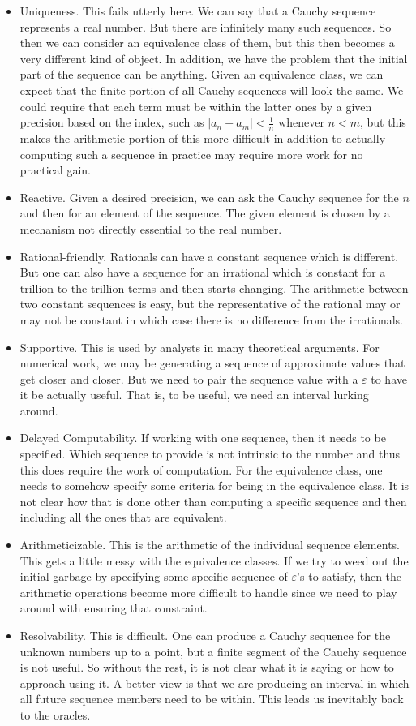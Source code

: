 \documentclass[12pt]{article}
\theoremstyle{remark}
\begin{document}
\begin{itemize}
    \item Uniqueness. This fails utterly here. We can say that a Cauchy sequence represents a real number. But there are infinitely many such sequences. So then we can consider an equivalence class of them, but this then becomes a very different kind of object. In addition, we have the problem that the initial part of the sequence can be anything. Given an equivalence class, we can expect that the finite portion of all Cauchy sequences will look the same. We could require that each term must be within the latter ones by a given precision based on the index, such as $|a_n - a_m| < \tfrac{1}{n}$ whenever $n < m$, but this makes the arithmetic portion of this more difficult in addition to actually computing such a sequence in practice may require more work for no practical gain. 
    \item Reactive. Given a desired precision, we can ask the Cauchy sequence for the $n$ and then for an element of the sequence. The given element is chosen by a mechanism not directly essential to the real number. 
    \item Rational-friendly. Rationals can have a constant sequence which is different. But one can also have a sequence for an irrational which is constant for a trillion to the trillion terms and then starts changing. The arithmetic between two constant sequences is easy, but the representative of the rational may or may not be constant in which case there is no difference from the irrationals.   
    \item Supportive. This is used by analysts in many theoretical arguments. For numerical work, we may be generating a sequence of approximate values that get closer and closer. But we need to pair the sequence value with a $\varepsilon$ to have it be actually useful. That is, to be useful, we need an interval lurking around. 
    \item Delayed Computability. If working with one sequence, then it needs to be specified. Which sequence to provide is not intrinsic to the number and thus this does require the work of computation.  For the equivalence class, one needs to somehow specify some criteria for being in the equivalence class. It is not clear how that is done other than computing a specific sequence and then including all the ones that are equivalent. 
    \item Arithmeticizable. This is the arithmetic of the individual sequence elements. This gets a little messy with the equivalence classes. If we try to weed out the initial garbage by specifying some specific sequence of $\varepsilon$'s to satisfy, then the arithmetic operations become more difficult to handle since we need to play around with ensuring that constraint.  
    \item Resolvability. This is difficult. One can produce a Cauchy sequence for the unknown numbers up to a point, but a finite segment of the Cauchy sequence is not useful. So without the rest, it is not clear what it is saying or how to approach using it. A better view is that we are producing an interval in which all future sequence members need to be within. This leads us inevitably back to the oracles. 
\end{itemize}
\end{document}
